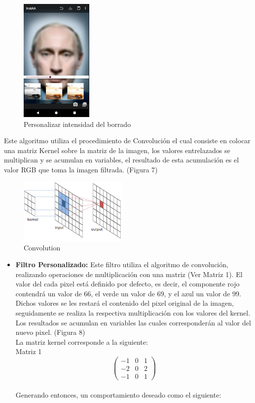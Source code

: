 \documentclass[journal]{IEEEtran}
\begin{document}
	\begin{figure}[h]
		\centering
		\includegraphics[width = 100pt]{personalizarBorrado.png}
		\caption{Personalizar intensidad del borrado}
	\end{figure}
		
	
	\newpage
	Este algoritmo utiliza el procedimiento de Convolución el cual consiste en colocar una matriz Kernel sobre la matriz de la imagen, los valores entrelazados se multiplican y se acumulan en variables, el resultado de esta acumulación es el valor RGB que toma la imagen filtrada. (Figura 7)
	
	\begin{figure}[h]
		\centering
		\includegraphics[width = 150pt]{convolution.png}
		\caption{Convolution}
	\end{figure}

	
	\begin{itemize}
		
	\item{\bf Filtro Personalizado:} Este filtro utiliza el algoritmo de convolución, realizando operaciones de multiplicación con una matriz (Ver Matriz 1). El valor del cada pixel está definido por defecto, es decir, el componente rojo contendrá un valor de 66, el verde un valor de 69, y el azul un valor de 99. Dichos valores se les restará el contenido del pixel original de la imagen, seguidamente se realiza la respectiva multiplicación con los valores del kernel. Los resultados se acumulan en variables las cuales corresponderán al valor del nuevo pixel. (Figura 8) \\
	
	\newpage
	La matriz kernel corresponde a la siguiente: \\
	Matriz 1
	\[ \left( \begin{array}{ccc} %
	-1 & 0 & 1 \\
	-2 & 0 & 2 \\
	-1 & 0 & 1 
	\end{array} \right)\]  \\
	
	Generando entonces, un comportamiento deseado como el siguiente:
	
	\end{itemize}
\end{document}
